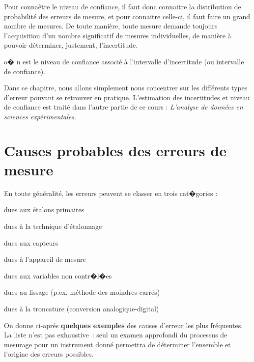Pour connaêtre le niveau de confiance, il faut donc connaitre la distribution de probabilité des erreurs de mesure, et pour connaitre celle-ci, il faut faire un grand nombre de mesures. De toute manière, toute mesure demande toujours l'acquisition d'un nombre significatif de mesures individuelles, de manière à pouvoir déterminer, justement, l'incertitude.

\begin{center}
\end{center}
o� n est le niveau de confiance associé à l'intervalle d'incertitude (ou intervalle de confiance).


Dans ce chapitre, nous allons simplement nous concentrer sur les différents types d'erreur pouvant se retrouver en pratique. L'estimation des incertitudes et niveau de confiance est traité dans l'autre partie de ce cours : \textit{L'analyse de données en sciences expérimentales}.

\newpage

\section{Causes probables des erreurs de mesure}

En toute généralité, les erreurs peuvent se classer en trois cat�gories :
\begin{description}
\item[1) Les erreurs d'étalonnage]
\item dues aux étalons primaires
\item dues à la technique d'étalonnage
\item[2) Les erreurs d'acquisition de données]
\item dues aux capteurs
\item dues à l'appareil de mesure
\item dues aux variables non contr�l�es
\item[3) Les erreurs lors de l'analyse des données]
\item dues au lissage (p.ex. méthode des moindres carrés)
\item dues à la troncature (conversion analogique-digital)
\end{description}
On donne ci-aprés \textbf{quelques exemples} des causes d'erreur les plus fréquentes. La liste n'est pas exhaustive~: seul un examen approfondi du processus de mesurage pour un instrument donné permettra de déterminer l'ensemble et l'origine des erreurs possibles.

